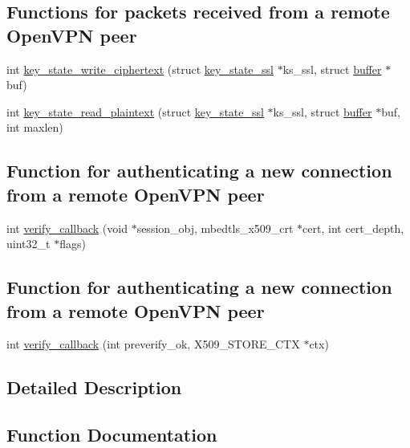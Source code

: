 \subsection*{Functions for packets received from a remote Open\+V\+P\+N peer}
\begin{DoxyCompactItemize}
\item 
int \hyperlink{group__control__tls_ga5712e1bfbeafff1041a99b57cf4a91f4}{key\+\_\+state\+\_\+write\+\_\+ciphertext} (struct \hyperlink{structkey__state__ssl}{key\+\_\+state\+\_\+ssl} $\ast$ks\+\_\+ssl, struct \hyperlink{structbuffer}{buffer} $\ast$buf)
\item 
int \hyperlink{group__control__tls_gae5597992eeb64d1be998be0ccf98bf97}{key\+\_\+state\+\_\+read\+\_\+plaintext} (struct \hyperlink{structkey__state__ssl}{key\+\_\+state\+\_\+ssl} $\ast$ks\+\_\+ssl, struct \hyperlink{structbuffer}{buffer} $\ast$buf, int maxlen)
\end{DoxyCompactItemize}
\subsection*{Function for authenticating a new connection from a remote Open\+V\+P\+N peer}
\begin{DoxyCompactItemize}
\item 
int \hyperlink{group__control__tls_gadeac70d67a80b44a96cbde2368dd5f3c}{verify\+\_\+callback} (void $\ast$session\+\_\+obj, mbedtls\+\_\+x509\+\_\+crt $\ast$cert, int cert\+\_\+depth, uint32\+\_\+t $\ast$flags)
\end{DoxyCompactItemize}
\subsection*{Function for authenticating a new connection from a remote Open\+V\+P\+N peer}
\begin{DoxyCompactItemize}
\item 
int \hyperlink{group__control__tls_gaf045c97f727aebae9e8fc9852421c4f3}{verify\+\_\+callback} (int preverify\+\_\+ok, X509\+\_\+\+S\+T\+O\+R\+E\+\_\+\+C\+T\+X $\ast$ctx)
\end{DoxyCompactItemize}


\subsection{Detailed Description}


\subsection{Function Documentation}
\hypertarget{group__control__tls_ga7260a351c5bb3bf22628278e09f2f7b3}{}

